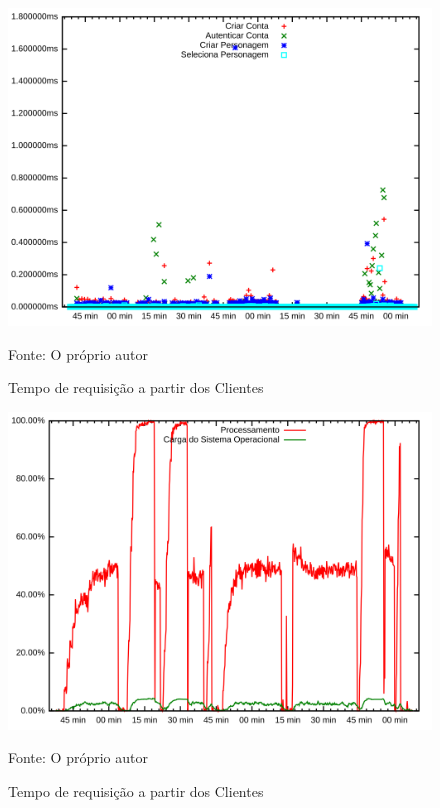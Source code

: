 \begin{figure}[htb!]
    \caption{Tempo de requisição a partir dos Clientes}
    \includegraphics[width=\textwidth]{metricas_rudy_t3/rudyc_http.png}
    \centering
    
    Fonte: O próprio autor
\end{figure}

\begin{figure}[htb!]
    \caption{Tempo de requisição a partir dos Clientes}
    \includegraphics[width=\textwidth]{metricas_rudy_t3/cpu.png}
    \centering
    
    Fonte: O próprio autor
\end{figure}

